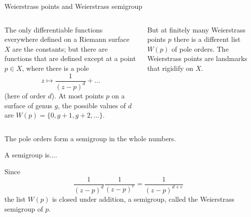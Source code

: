 \documentclass[12pt, aspectratio=169]{beamer}
\begin{document}
\begin{frame}{Weierstrass points and Weierstrass semigroup}
\begin{columns}
 The only differentiable functions
 everywhere defined on a Riemann surface $X$ are the constants;
 but there are functions that are defined except
 at a point $p\in X$, where there is a pole 
 $$
 z\mapsto \frac{1}{(z-p)^d} + \dots
 $$
 (here of order $d$). At most points $p$ on a surface of
 genus $g$, the possible values of $d$ are
$W(p) = \{0, g+1,g+2,\dots\}$.

But at finitely many \alert{Weierstrass points} $p$
there is a different list $W(p)$ of pole orders.
The Weierstrass points are landmarks that rigidify on $X$.
\end{columns}
 \end{frame}
\begin{frame}{The pole orders form a \alert{semigroup} in the whole numbers.}
 
 A semigroup is....

Since
$$
\frac{1}{(z-p)^d}\frac{1}{(z-p)^e} = \frac{1}{(z-p)^{d+e}}
$$
the list $W(p)$ is closed under addition, a \alert{semigroup},
called the \alert{Weierstrass semigroup} of $p$.


 
\end{frame}
\end{document}
